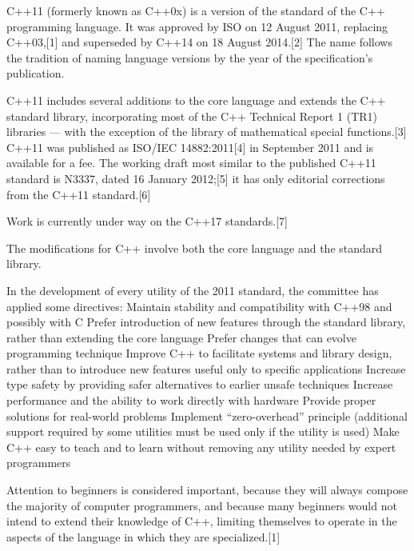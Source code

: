 C++11 (formerly known as C++0x) is a version of the standard of the C++ programming language. It was approved by ISO on 12 August 2011, replacing C++03,[1] and superseded by C++14 on 18 August 2014.[2] The name follows the tradition of naming language versions by the year of the specification's publication.
 
C++11 includes several additions to the core language and extends the C++ standard library, incorporating most of the C++ Technical Report 1 (TR1) libraries — with the exception of the library of mathematical special functions.[3] C++11 was published as ISO/IEC 14882:2011[4] in September 2011 and is available for a fee. The working draft most similar to the published C++11 standard is N3337, dated 16 January 2012;[5] it has only editorial corrections from the C++11 standard.[6]
 
Work is currently under way on the C++17 standards.[7]

The modifications for C++ involve both the core language and the standard library.
 
In the development of every utility of the 2011 standard, the committee has applied some directives:
 Maintain stability and compatibility with C++98 and possibly with C
 Prefer introduction of new features through the standard library, rather than extending the core language
 Prefer changes that can evolve programming technique
 Improve C++ to facilitate systems and library design, rather than to introduce new features useful only to specific applications
 Increase type safety by providing safer alternatives to earlier unsafe techniques
 Increase performance and the ability to work directly with hardware
 Provide proper solutions for real-world problems
 Implement “zero-overhead” principle (additional support required by some utilities must be used only if the utility is used)
 Make C++ easy to teach and to learn without removing any utility needed by expert programmers
 
Attention to beginners is considered important, because they will always compose the majority of computer programmers, and because many beginners would not intend to extend their knowledge of C++, limiting themselves to operate in the aspects of the language in which they are specialized.[1]
